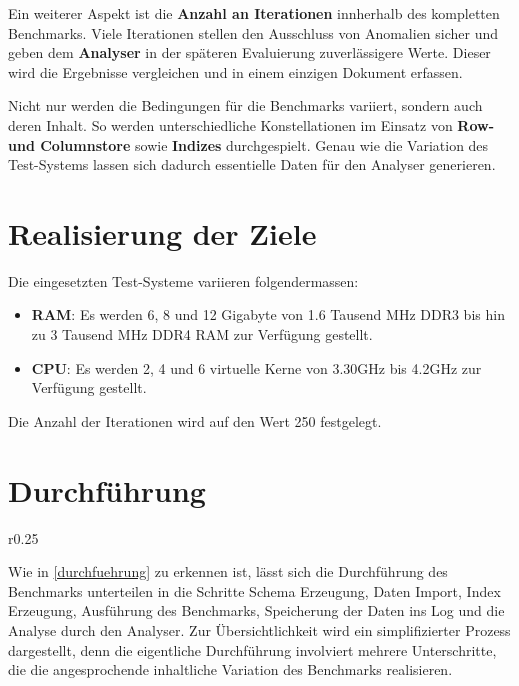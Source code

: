 Ein weiterer Aspekt ist die \textbf{Anzahl an Iterationen} innherhalb des kompletten Benchmarks. Viele Iterationen stellen den Ausschluss von Anomalien sicher und geben dem \textbf{Analyser} in der späteren Evaluierung zuverlässigere Werte. Dieser wird die Ergebnisse vergleichen und in einem einzigen Dokument erfassen. 

Nicht nur werden die Bedingungen für die Benchmarks variiert, sondern auch deren Inhalt. So werden unterschiedliche Konstellationen im Einsatz von \textbf{Row- und Columnstore} sowie \textbf{Indizes} durchgespielt. Genau wie die Variation des Test-Systems lassen sich dadurch essentielle Daten für den Analyser generieren. 

\section{Realisierung der Ziele}\label{run:real}

Die eingesetzten Test-Systeme variieren folgendermassen: 
\begin{itemize}
	\item \textbf{RAM}: Es werden 6, 8 und 12 Gigabyte von 1.6 Tausend MHz DDR3 bis hin zu 3 Tausend MHz DDR4 RAM zur Verfügung gestellt. 
	\item \textbf{CPU}: Es werden 2, 4 und 6 virtuelle Kerne von 3.30GHz bis 4.2GHz zur Verfügung gestellt. 
\end{itemize}

Die Anzahl der Iterationen wird auf den Wert 250 festgelegt.

\newpage

\section{Durchführung}\label{run:exec}

\begin{wrapfigure}{r}{0.25\textwidth} 
\end{wrapfigure}

Wie in \autoref{durchfuehrung} zu erkennen ist, lässt sich die Durchführung des Benchmarks unterteilen in die Schritte Schema Erzeugung, Daten Import, Index Erzeugung, Ausführung des Benchmarks, Speicherung der Daten ins Log und die Analyse durch den Analyser. Zur Übersichtlichkeit wird ein simplifizierter Prozess dargestellt, denn die eigentliche Durchführung involviert mehrere Unterschritte, die die angesprochende inhaltliche Variation des Benchmarks realisieren. 

